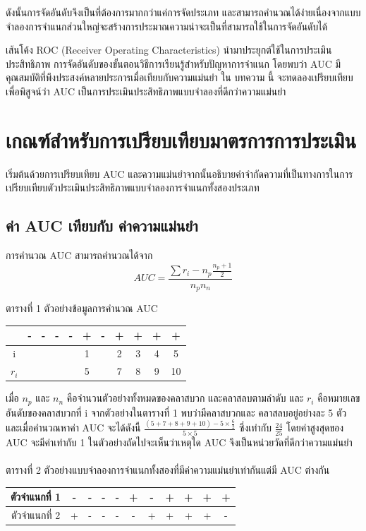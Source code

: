 \documentclass[twoside, twocolumn, 12pt]{article}
\begin{document}
ดังนั้นการจัดอันดับจึงเป็นที่ต้องการมากกว่าแค่การจัดประเภท และสามารถคำนวณได้ง่ายเนื่องจากแบบจำลองการจำแนกส่วนใหญ่จะสร้างการประมาณความน่าจะเป็นที่สามารถใช้ในการจัดอันดับได้

เส้นโค้ง ROC (Receiver Operating Characteristics) นำมาประยุกต์ใช้ในการประเมินประสิทธิภาพ \cite{2, 3} การจัดอันดับของขั้นตอนวิธีการเรียนรู้สำหรับปัญหาการจำแนก \cite{4, 5} โดยพบว่า AUC มีคุณสมบัติที่พึงประสงค์หลายประการเมื่อเทียบกับความแม่นยำ \cite{6}
ใน บทความ นี้ จะทดลองเปรียบเทียบเพื่อพิสูจน์ว่า AUC เป็นการประเมินประสิทธิภาพแบบจำลองที่ดีกว่าความแม่นยำ

\section{เกณฑ์สำหรับการเปรียบเทียบมาตรการการประเมิน}
\quad เริ่มต้นด้วยการเปรียบเทียบ AUC และความแม่นยำจากนั้นอธิบายคำจำกัดความที่เป็นทางการในการเปรียบเทียบตัวประเมินประสิทธิภาพแบบจำลองการจำแนกทั้งสองประเภท
\subsection{ค่า AUC เทียบกับ ค่าความแม่นยำ}
\quad การคำนวณ AUC สามารถคำนวณได้จาก \cite{7}
\begin{equation}
AUC = \frac{\sum r_i-n_p\frac{n_p + 1}{2}}{n_pn_n}
\end{equation}
\begin{center} ตารางที่ 1 ตัวอย่างข้อมูลการคำนวณ AUC \end{center}
\begin{center}
\begin{tabular}{ccccccccccc}
  \hline
  &-&-&-&-&+&-&+&+&+&+ \\
  \hline
  i&&&&&1&&2&3&4&5 \\
  $r_i$& & & & & 5&&7&8&9&10\\
  \hline  
\end{tabular}
\end{center}

เมื่อ $n_p$ และ $n_n$ คือจำนวนตัวอย่างทั้งหมดของคลาสบวก และคลาสลบตามลำดับ และ $r_i$ คือหมายเลขอันดับของคลาสบวกที่ i จากตัวอย่างในตารางที่ 1 พบว่ามีคลาสบวกและ คลาสลบอยู่อย่างละ 5 ตัว และเมื่อคำนวณหาค่า AUC จะได้ดังนี้ $\frac{(5+7+8+9+10)- 5\times\frac{6}{2}}{5\times5}$ ซึ่งเท่ากับ $\frac{24}{25}$ โดยค่าสูงสุดของ AUC จะมีค่าเท่ากับ 1 ในตัวอย่างถัดไปจะเห็นว่าเหตุใด AUC จึงเป็นหน่วยวัดที่ดีกว่าความแม่นยำ\\\\
ตารางที่ 2 ตัวอย่างแบบจำลองการจำแนกทั้งสองที่มีค่าความแม่นยำเท่ากันแต่มี AUC ต่างกัน
\begin{center}
\begin{tabular}{|c|ccccc|ccccc|}
  \hline
  ตัวจำแนกที่ 1 &-& -& -& -& +& -& +& +& +& +\\
  \hline
  ตัวจำแนกที่ 2 & +& -& -& -& -& +& +& +& +& -\\
  \hline  
\end{tabular}
\end{center}
\end{document}
